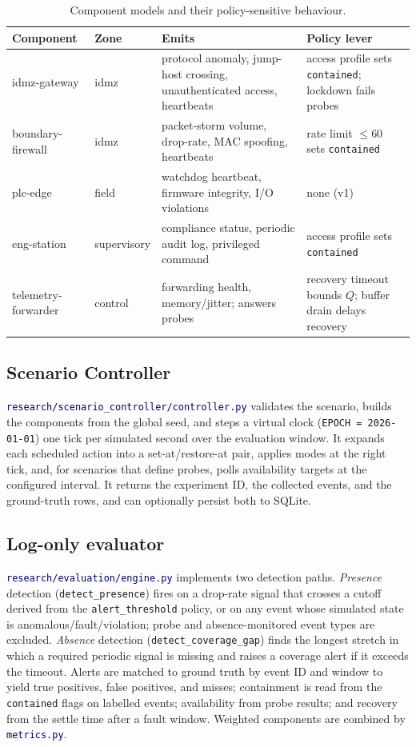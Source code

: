 \documentclass[11pt]{article}
\newcommand{\code}[1]{\texttt{\small #1}}
\newcommand{\file}[1]{\textcolor{navy}{\texttt{\small #1}}}
\begin{document}
\begin{table}[h]
\centering
\caption{Component models and their policy-sensitive behaviour.}
\label{tab:comp}
\small
\begin{tabular}{p{2.8cm} p{1.7cm} p{4.3cm} p{4.0cm}}
\toprule
\textbf{Component} & \textbf{Zone} & \textbf{Emits} & \textbf{Policy lever}\\
\midrule
idmz-gateway & idmz
  & protocol anomaly, jump-host crossing, unauthenticated access, heartbeats
  & access profile sets \code{contained}; lockdown fails probes\\
boundary-firewall & idmz
  & packet-storm volume, drop-rate, MAC spoofing, heartbeats
  & rate limit $\le 60$ sets \code{contained}\\
plc-edge & field
  & watchdog heartbeat, firmware integrity, I/O violations
  & none (v1)\\
eng-station & supervisory
  & compliance status, periodic audit log, privileged command
  & access profile sets \code{contained}\\
telemetry-forwarder & control
  & forwarding health, memory/jitter; answers probes
  & recovery timeout bounds $Q$; buffer drain delays recovery\\
\bottomrule
\end{tabular}
\end{table}

\subsection{Scenario Controller}
\file{research/scenario\_controller/controller.py} validates the scenario, builds
the components from the global seed, and steps a virtual clock
(\code{EPOCH = 2026-01-01}) one tick per simulated second over the evaluation
window. It expands each scheduled action into a set-at/restore-at pair, applies
modes at the right tick, and, for scenarios that define probes, polls availability
targets at the configured interval. It returns the experiment ID, the collected
events, and the ground-truth rows, and can optionally persist both to SQLite.

\subsection{Log-only evaluator}
\file{research/evaluation/engine.py} implements two detection paths.
\emph{Presence} detection (\code{detect\_presence}) fires on a drop-rate signal
that crosses a cutoff derived from the \code{alert\_threshold} policy, or on any
event whose simulated state is anomalous/fault/violation; probe and
absence-monitored event types are excluded. \emph{Absence} detection
(\code{detect\_coverage\_gap}) finds the longest stretch in which a required
periodic signal is missing and raises a coverage alert if it exceeds the timeout.
Alerts are matched to ground truth by event ID and window to yield true
positives, false positives, and misses; containment is read from the
\code{contained} flags on labelled events; availability from probe results; and
recovery from the settle time after a fault window. Weighted components are
combined by \file{metrics.py}.
\end{document}
